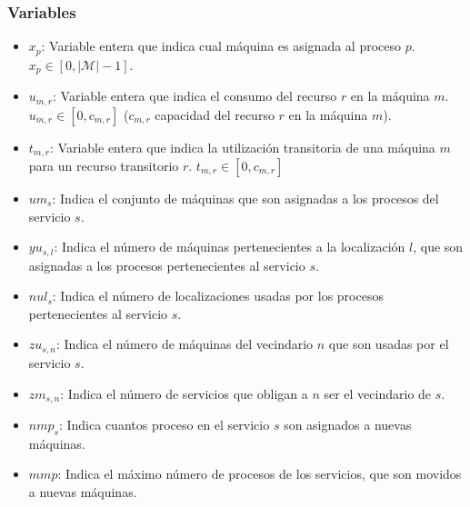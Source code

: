 \documentclass[../informe2.tex]{subfiles}
\begin{document}
\subsubsection{Variables}
\begin{itemize}
	\item $x_p$: Variable entera que indica cual máquina es asignada al proceso $p$. $x_p \in [0,|\mathcal{M}|-1]$.
	\item $u_{m,r}$: Variable entera que indica el consumo del recurso $r$ en la máquina $m$. $u_{m,r} \in [0,c_{m,r}]$ ($c_{m,r}$ capacidad del recurso $r$ en la máquina $m$).
	\item $t_{m,r}$: Variable entera que indica la utilización transitoria de una máquina $m$ para un recurso transitorio $r$. $t_{m,r} \in [0,c_{m,r}]$
	\item $um_s$: Indica el conjunto de máquinas que son asignadas a los procesos del servicio $s$.
	\item $yu_{s,l}$: Indica el número de máquinas pertenecientes a la localización $l$, que son asignadas a los procesos pertenecientes al servicio $s$.
	\item $nul_s$: Indica el número de localizaciones usadas por los procesos pertenecientes al servicio $s$.
	\item $zu_{s,n}$: Indica el número de máquinas del vecindario $n$ que son usadas por el servicio $s$.
	\item $zm_{s,n}$: Indica el número de servicios que obligan a $n$ ser el vecindario de $s$.
	\item $nmp_s$: Indica cuantos proceso en el servicio $s$ son asignados a nuevas máquinas.
	\item $mmp$: Indica el máximo número de procesos de los servicios, que son movidos a nuevas máquinas.
\end{itemize}
\end{document}
